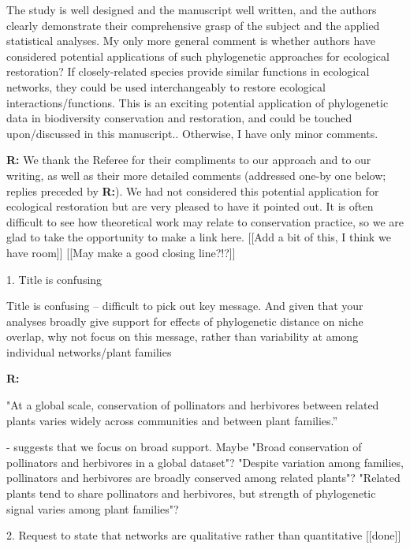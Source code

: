 \documentclass[12pt]{letter}
\newenvironment{refquote}{\bigskip \begin{it}}{\end{it}\smallskip}
\begin{document}
	\begin{refquote}
		The study is well designed and the manuscript well written, and the authors clearly demonstrate their comprehensive grasp of the subject and the applied statistical analyses.
		My only more general comment is whether authors have considered potential applications of such phylogenetic approaches for ecological restoration? If closely-related species provide similar functions in ecological networks, they could be used interchangeably to restore ecological interactions/functions. This is an exciting potential application of phylogenetic data in biodiversity conservation and restoration, and could be touched upon/discussed in this manuscript.. 
		Otherwise, I have only minor comments.
	\end{refquote}

	\textbf{R:} We thank the Referee for their compliments to our approach and to our writing, as well as their more detailed comments (addressed one-by one below; replies preceded by \textbf{R:}). We had not considered this potential application for ecological restoration but are very pleased to have it pointed out. It is often difficult to see how theoretical work may relate to conservation practice, so we are glad to take the opportunity to make a link here. [[Add a bit of this, I think we have room]] [[May make a good closing line?!?]]

	1. Title is confusing

		\begin{refquote}
			Title is confusing – difficult to pick out key message. And given that your analyses broadly give support for effects of phylogenetic distance on niche overlap, why not focus on this message, rather than variability at among individual networks/plant families
		\end{refquote}


		\textbf{R:} 


"At a global scale, conservation of pollinators and herbivores between related plants varies widely across communities and between plant families.”

- suggests that we focus on broad support. Maybe "Broad conservation of pollinators and herbivores in a global dataset"?
"Despite variation among families, pollinators and herbivores are broadly conserved among related plants"?
"Related plants tend to share pollinators and herbivores, but strength of phylogenetic signal varies among plant families"?

	2. Request to state that networks are qualitative rather than quantitative [[done]]
\end{document}
